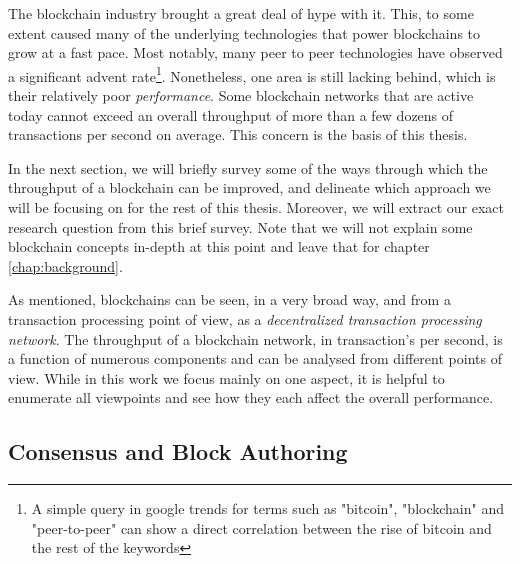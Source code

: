The blockchain industry brought a great deal of hype with it. This, to some extent caused many of the underlying technologies that power blockchains to grow at a fast pace. Most notably, many peer to peer technologies have observed a significant advent rate\footnote{A simple query in google trends for terms such as "bitcoin", "blockchain" and "peer-to-peer" can show a direct correlation between the rise of bitcoin and the rest of the keywords}. Nonetheless, one area is still lacking behind, which is their relatively poor \textit{performance}. Some blockchain networks that are active today cannot exceed an overall throughput of more than a few dozens of transactions per second on average. This concern is the basis of this thesis. 

In the next section, we will briefly survey some of the ways through which the throughput of a blockchain can be improved, and delineate which approach we will be focusing on for the rest of this thesis. Moreover, we will extract our exact research question from this brief survey. Note that we will not explain some blockchain concepts in-depth at this point and leave that for chapter \ref{chap:background}.


As mentioned, blockchains can be seen, in a very broad way, and from a transaction processing point of view, as a \textit{decentralized transaction processing network}. The throughput of a blockchain network, in transaction's per second, is a function of numerous components and can be analysed from different points of view. While in this work we focus mainly on one aspect, it is helpful to enumerate all viewpoints and see how they each affect the overall performance.

\subsection{Consensus and Block Authoring}

